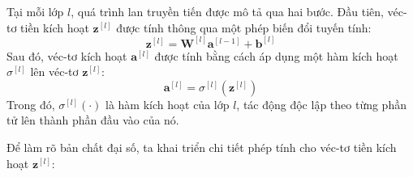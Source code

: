 Tại mỗi lớp $l$, quá trình lan truyền tiến được mô tả qua hai bước. Đầu tiên, véc-tơ tiền kích hoạt $\mathbf{z}^{[l]}$ được tính thông qua một phép biến đổi tuyến tính:
\begin{equation}
    \mathbf{z}^{[l]} = \mathbf{W}^{[l]} \mathbf{a}^{[l-1]} + \mathbf{b}^{[l]}
\end{equation}
Sau đó, véc-tơ kích hoạt $\mathbf{a}^{[l]}$ được tính bằng cách áp dụng một hàm kích hoạt $\sigma^{[l]}$ lên véc-tơ $\mathbf{z}^{[l]}$:
\begin{equation}
    \mathbf{a}^{[l]} = \sigma^{[l]}(\mathbf{z}^{[l]})
\end{equation}
Trong đó, $\sigma^{[l]}(\cdot)$ là hàm kích hoạt của lớp $l$, tác động độc lập theo từng phần tử lên thành phần đầu vào của nó.

Để làm rõ bản chất đại số, ta khai triển chi tiết phép tính cho véc-tơ tiền kích hoạt $\mathbf{z}^{[l]}$:
